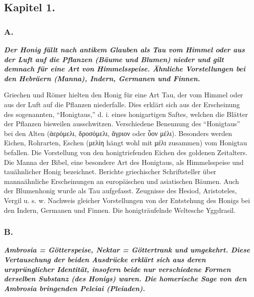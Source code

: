 \documentclass[a4paper, 11pt, oneside]{article}
\begin{document}
\subsection*{Kapitel 1.}

\subsubsection*{A.}

\textbf{\emph{Der Honig fällt nach antikem Glauben als Tau vom Himmel oder aus der Luft auf die Pflanzen (Bäume und Blumen) nieder und gilt demnach für eine Art von Himmelsspeise. Ähnliche Vorstellungen bei den Hebräern (Manna), Indern, Germanen und Finnen.}}

Griechen und Römer hielten den Honig für eine Art Tau, der vom Himmel oder aus der Luft auf die Pflanzen niederfalle. Dies erklärt sich aus der Erscheinung des sogenannten, "`Honigtaus,"' d. i. eines honigartigen Saftes, welchen die Blätter der Pflanzen bisweilen ausschwitzen. Verschiedene Benennung des "`Honigtaus"' bei den Alten (ἀερόμελι, δροσόμελι, ἄγριον oder ὗον μέλι). Besonders werden Eichen, Rohrarten, Eschen (μελίη hängt wohl mit μέλι zusammen) vom Honigtau befallen. Die Vorstellung von den honigtriefenden Eichen des goldenen Zeitalters. Die Manna der Bibel, eine besondere Art des Honigtaus, als Himmelsspeise und tauähnlicher Honig bezeichnet. Berichte griechischer Schriftsteller über mannaähnliche Erscheinungen an europäischen und asiatischen Bäumen. Auch der Blumenhonig wurde als Tau aufgefasst. Zeugnisse des Hesiod, Aristoteles, Vergil u. s. w. Nachweis gleicher Vorstellungen von der Entstehung des Honigs bei den Indern, Germanen und Finnen. Die honigträufelnde Weltesche Yggdrasil.

\subsubsection*{B.}

\textbf{\emph{Ambrosia = Götterspeise, Nektar = Göttertrank und umgekehrt. Diese Vertauschung der beiden Ausdrücke erklärt sich aus deren ursprünglicher Identität, insofern beide nur verschiedene Formen derselben Substanz (des Honigs) waren. Die homerische Sage von den Ambrosia bringenden Peleiai (Pleiaden).}}
\end{document}
